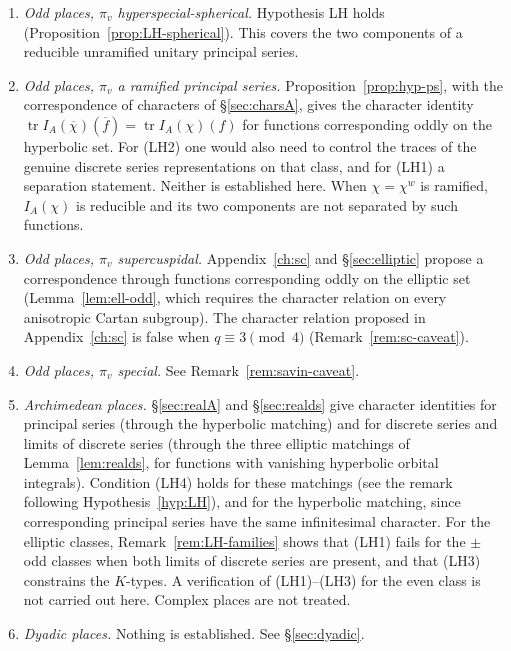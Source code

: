 \documentclass[12pt,letterpaper,openany]{book}
\theoremstyle{plain}
\theoremstyle{definition}
\theoremstyle{remark}
\theoremstyle{remark}
\newcommand{\tr}{\operatorname{tr}}
\begin{document}
\begin{enumerate}
\item {\em Odd places, $\pi_v$ hyperspecial-spherical.} Hypothesis LH
holds (Proposition~\ref{prop:LH-spherical}). This covers the two
components of a reducible unramified unitary principal series.

\item {\em Odd places, $\pi_v$ a ramified principal series.}
Proposition~\ref{prop:hyp-ps}, with the correspondence of
characters of \S\ref{sec:charsA}, gives the character identity
$\tr I_A(\overline{\chi})(\overline{f})=\tr I_A(\chi)(f)$ for
functions corresponding oddly on the hyperbolic set. For (LH2) one would
also need to control the traces of
the genuine discrete series representations on that class, and for
(LH1) a separation statement. Neither is established here.
When $\chi=\chi^w$ is ramified, $I_A(\chi)$ is reducible and its two
components are not separated by such functions.

\item {\em Odd places, $\pi_v$ supercuspidal.} Appendix~\ref{ch:sc} and
\S\ref{sec:elliptic} propose a correspondence through functions
corresponding oddly on the elliptic set (Lemma~\ref{lem:ell-odd}, which
requires the character relation on every anisotropic Cartan subgroup).
The character relation proposed in Appendix~\ref{ch:sc} is false when
$q\equiv3\pmod4$ (Remark~\ref{rem:sc-caveat}).

\item {\em Odd places, $\pi_v$ special.} See
Remark~\ref{rem:savin-caveat}.

\item {\em Archimedean places.} \S\ref{sec:realA} and
\S\ref{sec:realds} give character identities for principal series
(through the hyperbolic matching) and for discrete series and limits of
discrete series (through the three elliptic matchings of
Lemma~\ref{lem:realds}, for functions with vanishing hyperbolic orbital
integrals). Condition (LH4) holds for these matchings (see the remark
following Hypothesis~\ref{hyp:LH}), and for the hyperbolic matching,
since corresponding principal series have the same infinitesimal
character. For the elliptic classes, Remark~\ref{rem:LH-families} shows
that (LH1) fails for the $\pm$odd classes when both limits of discrete
series are present, and that (LH3) constrains the $K$-types. A
verification of (LH1)--(LH3) for the even class is not
carried out here. Complex places are not treated.

\item {\em Dyadic places.} Nothing is established. See
\S\ref{sec:dyadic}.
\end{enumerate}
\end{document}
